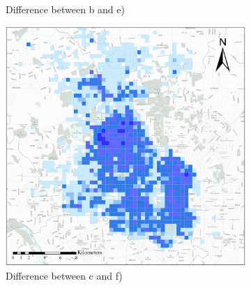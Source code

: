 \documentclass[preprints,ijgi,submit,moreauthors]{Definitions/mdpi}
\begin{document}
\begin{figure}[ht]
\begin{subfigure}{.28\textwidth}
        \caption{Difference between b and e)}\label{fig:p_b_dif}
    \end{subfigure}
        \begin{subfigure}{.28\textwidth}
        \includegraphics[width=\textwidth]{Figures/BSSMinusmp3.eps}
        \caption{Difference between c and f)}\label{fig:p_c_dif}
    \end{subfigure}
    \begin{subfigure}{.14\textwidth}

\end{subfigure}
\end{figure}
\end{document}

